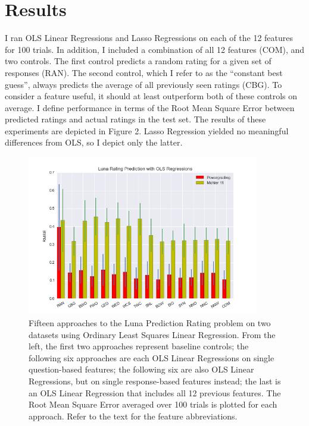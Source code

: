 \section{Results}
I ran OLS Linear Regressions and Lasso Regressions on each of the 12 features for 100 trials. In addition, I included a combination of all 12 features (COM), and two controls. The first control predicts a random rating for a given set of responses (RAN). The second control, which I refer to as the ``constant best guess'', always predicts the average of all previously seen ratings (CBG). To consider a feature useful, it should at least outperform both of these controls on average. I define performance in terms of the Root Mean Square Error between predicted ratings and actual ratings in the test set. The results of these experiments are depicted in Figure 2. Lasso Regression yielded no meaningful differences from OLS, so I depict only the latter.
\begin{figure}[h]
\centerline{%
\includegraphics[width=0.9\textwidth]{figures/ratingPredictionFinalResults2.png}%
}%
\caption{Fifteen approaches to the Luna Prediction Rating problem on two datasets using Ordinary Least Squares Linear Regression. From the left, the first two approaches represent baseline controls; the following six approaches are each OLS Linear Regressions on single question-based features; the following six are also OLS Linear Regressions, but on single response-based features instead; the last is an OLS Linear Regression that includes all 12 previous features. The Root Mean Square Error averaged over 100 trials is plotted for each approach. Refer to the text for the feature abbreviations.}
\label{fig:RatingDistribution}
\end{figure}

